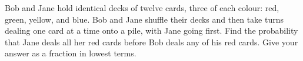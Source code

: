 Bob and Jane hold identical decks of twelve cards, three of each colour: red, green, yellow, and blue. Bob and Jane shuffle their decks and then take turns dealing one card at a time onto a pile, with Jane going first. Find the probability that Jane deals all her red cards before Bob deals any of his red cards. Give your answer as a fraction in lowest terms.
